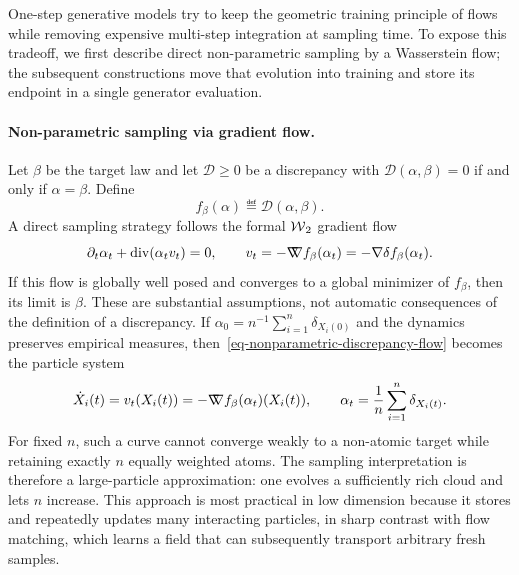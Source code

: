 One-step generative models try to keep the geometric training principle of flows while removing expensive multi-step integration at sampling time. To expose this tradeoff, we first describe direct non-parametric sampling by a Wasserstein flow; the subsequent constructions move that evolution into training and store its endpoint in a single generator evaluation.

\paragraph{Non-parametric sampling via gradient flow.}
Let $\beta$ be the target law and let $\mathcal D\geq0$ be a discrepancy with $\mathcal D(\alpha,\beta)=0$ if and only if $\alpha=\beta$. Define
\begin{equation}\label{eq-one-step-discrepancy-energy}
	f_\beta(\alpha)\eqdef\mathcal D(\alpha,\beta).
\end{equation}
A direct sampling strategy follows the formal $\operatorname{\mathcal{W}}_2$ gradient flow
\begin{equation}\label{eq-nonparametric-discrepancy-flow}
	\partial_t\alpha_t+\operatorname{div}(\alpha_t v_t)=0,
	\qquad
	v_t=-\mathord{\nabla\mkern-9.3mu\nabla} f_\beta(\alpha_t)
	=-\nabla\delta f_\beta(\alpha_t).
\end{equation}
If this flow is globally well posed and converges to a global minimizer of $f_\beta$, then its limit is $\beta$. These are substantial assumptions, not automatic consequences of the definition of a discrepancy. If $\alpha_0=n^{-1}\sum_{i=1}^n\delta_{X_i(0)}$ and the dynamics preserves empirical measures, then~\eqref{eq-nonparametric-discrepancy-flow} becomes the particle system
\begin{equation}\label{eq-nonparametric-particle-flow}
	\dot X_i(t)=v_t(X_i(t))
	=-\mathord{\nabla\mkern-9.3mu\nabla} f_\beta(\alpha_t)(X_i(t)),
	\qquad
	\alpha_t=\frac1n\sum_{i=1}^n\delta_{X_i(t)}.
\end{equation}
For fixed $n$, such a curve cannot converge weakly to a non-atomic target while retaining exactly $n$ equally weighted atoms. The sampling interpretation is therefore a large-particle approximation: one evolves a sufficiently rich cloud and lets $n$ increase. This approach is most practical in low dimension because it stores and repeatedly updates many interacting particles, in sharp contrast with flow matching, which learns a field that can subsequently transport arbitrary fresh samples.

